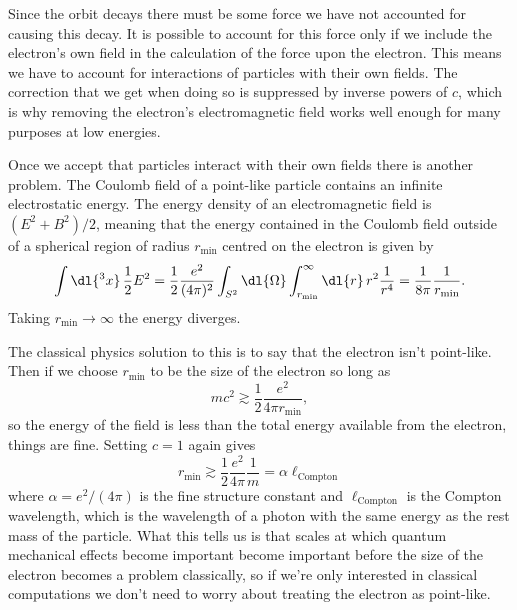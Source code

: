 \documentclass[fleqn]{NotesClass}
\begin{document}
    Since the orbit decays there must be some force we have not accounted for causing this decay.
    It is possible to account for this force only if we include the electron's own field in the calculation of the force upon the electron.
    This means we have to account for interactions of particles with their own fields.
    The correction that we get when doing so is suppressed by inverse powers of \(c\), which is why removing the electron's electromagnetic field works well enough for many purposes at low energies.
    
    Once we accept that particles interact with their own fields there is another problem.
    The Coulomb field of a point-like particle contains an infinite electrostatic energy.
    The energy density of an electromagnetic field is \((E^2 + B^2)/2\), meaning that the energy contained in the Coulomb field outside of a spherical region of radius \(r_{\min}\) centred on the electron is given by
    \begin{equation}
        \int \dl{^3x} \, \frac{1}{2}E^2 = \frac{1}{2}\frac{e^2}{(4\pi)^2} \int_{S^2} \dl{\Omega} \int_{r_{\min}}^{\infty} \dl{r} \, r^2 \frac{1}{r^4} = \frac{1}{8\pi} \frac{1}{r_{\min}}.
    \end{equation}
    Taking \(r_{\min} \to \infty\) the energy diverges.
    
    The classical physics solution to this is to say that the electron isn't point-like.
    Then if we choose \(r_{\min}\) to be the size of the electron so long as
    \begin{equation}
        mc^2 \gtrsim \frac{1}{2} \frac{e^2}{4\pi r_{\min}},
    \end{equation}
    so the energy of the field is less than the total energy available from the electron, things are fine.
    Setting \(c = 1\) again gives
    \begin{equation}
        r_{\min} \gtrsim \frac{1}{2} \frac{e^2}{4\pi} \frac{1}{m} = \alpha \ell_{\mathrm{Compton}}
    \end{equation}
    where \(\alpha = e^2/(4\pi)\) is the fine structure constant and \(\ell_{\mathrm{Compton}}\) is the Compton wavelength, which is the wavelength of a photon with the same energy as the rest mass of the particle.
    What this tells us is that scales at which quantum mechanical effects become important become important before the size of the electron becomes a problem classically, so if we're only interested in classical computations we don't need to worry about treating the electron as point-like.
    
\end{document}
